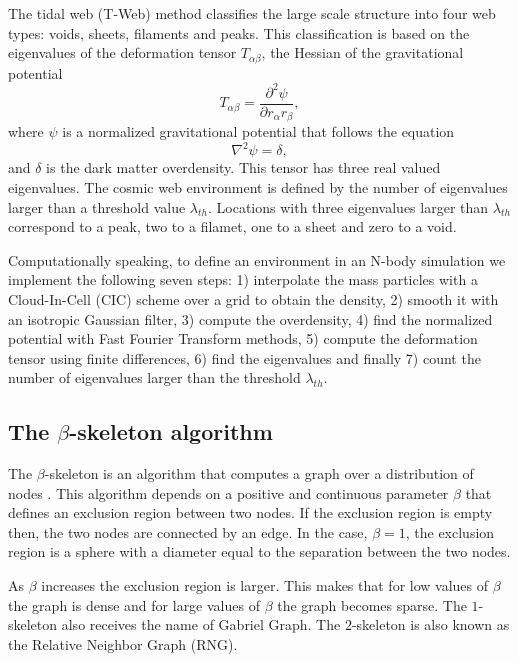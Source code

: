 \documentclass[usenatbib]{mnras}
\begin{document}
The tidal web (T-Web) method \citep{Hahn2007,Forero-Romero2009}
classifies the large scale structure into four web types: voids,
sheets, filaments and peaks.   
This classification is based on the eigenvalues of the deformation
tensor $T_{\alpha\beta}$, the Hessian of the gravitational potential 
\begin{equation}
T_{\alpha\beta}=\frac{\partial^2\psi}{\partial r_{\alpha}r_{\beta}},
\end{equation}
%
where $\psi$ is a normalized gravitational potential that follows the equation
\begin{equation}
    \nabla^2 \psi = \delta,
\end{equation}
%
and $\delta$ is the dark matter overdensity.
This tensor has three real valued eigenvalues. 
The cosmic web environment is defined by the number of eigenvalues
larger than a threshold value $\lambda_{th}$.
Locations with three eigenvalues larger than $\lambda_{th}$ correspond
to a peak, two to a filamet, one to a sheet and zero to a void. 

Computationally speaking, to define an environment in an N-body
simulation we implement the following seven steps: 1) interpolate the
mass particles with a Cloud-In-Cell  (CIC) scheme over a grid to
obtain the density, 2) smooth it with an isotropic Gaussian filter,
3) compute the overdensity, 4) find the normalized potential with Fast
Fourier Transform  methods, 5) compute the deformation tensor using
finite differences, 6) find the eigenvalues and finally 7) count the
number of eigenvalues larger than the threshold $\lambda_{th}$. 


\subsection{The $\beta$-skeleton algorithm}

The $\beta$-skeleton is an algorithm that computes a graph over a
distribution of nodes \citep{Kirkpatrick1985, Fang2019}.  
This algorithm depends on a positive and continuous parameter $\beta$
that defines an exclusion region between two nodes.
If the exclusion region is empty then, the two nodes are connected by
an edge.  
In the case, $\beta=1$, the exclusion region is a sphere with a
diameter equal to the separation between the two nodes.  

As $\beta$ increases the exclusion region is larger.
This makes that for low values of $\beta$ the graph is dense and for
large values of $\beta$ the graph becomes sparse. 
The $1$-skeleton also receives the name of Gabriel Graph.  
The $2$-skeleton is also known as the Relative Neighbor Graph (RNG). 
\end{document}
